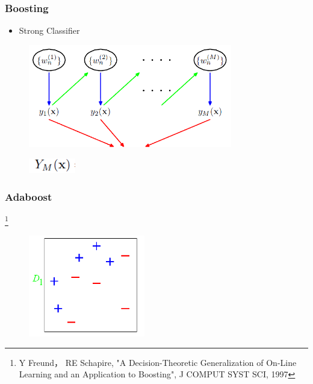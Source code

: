 \documentclass[10pt]{beamer}
\begin{document}
\begin{frame}
    \frametitle{Boosting}
   \begin{itemize}
   \item Strong Classifier
   \end{itemize}

   \begin{figure}[!ht]
   \centering
   \includegraphics[width=3.5in]{AAUgraphics/yx.png}
   \end{figure}
   \begin{figure}[!ht]
   \centering
   \includegraphics[width=0.8in]{AAUgraphics/yx1.png}
   \end{figure}

\end{frame}


\begin{frame}
    \frametitle{Adaboost}
   \footnote{Y Freund， RE Schapire, "A Decision-Theoretic Generalization of On-Line Learning and an Application to Boosting", J COMPUT SYST SCI, 1997}
   \begin{figure}[!ht]
   \centering
   \includegraphics[width=2.0in]{AAUgraphics/ada1.png}
   \end{figure}
\end{frame}
\end{document}
